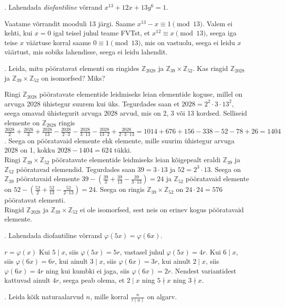 \documentclass[a4paper, 10pt]{article}
\newcommand{\Z}{\mathbb{Z}}
\begin{document}
. Lahendada \emph{diofantiline} võrrand $x^{13}+12x+13y^6=1$.

\bigskip
Vaatame võrrandit mooduli 13 järgi. Saame $x^{13}-x\equiv1 \pmod{13}$. Valem ei kehti, kui $x=0$ igal teisel juhul teame FVTst, et $x^{12}\equiv x \pmod{13}$, seega iga teise $x$ väärtuse korral saame $0\equiv 1 \pmod{13}$, mis on vastuolu, seega ei leidu $x$ väärtust, mis sobiks lahendisse, seega ei leidu lahendit.
\bigskip

. Leida, mitu pööratavat elementi on ringides $\Z_{2028}$ ja $\Z_{39}\times \Z_{52}$. Kas ringid $\Z_{2028}$ ja $\Z_{39}\times \Z_{52}$ on isomorfsed? Miks?

\bigskip
Ringi $\Z_{2028}$ pööratavate elementide leidmiseks leian elementide koguse, millel on arvuga 2028 ühistegur suurem kui üks. Tegurdades saan et $2028=2^2\cdot3\cdot13^2$, seega omavad ühistegurit arvuga 2028 arvud, mis on 2, 3 või 13 kordsed. Selliseid elemente on $\Z_{2028}$ ringis $\frac{2028}{2}+\frac{2028}{3}+\frac{2028}{13}-\frac{2028}{2\cdot3}-\frac{2028}{3\cdot13}-\frac{2028}{13\cdot2}+\frac{2028}{2\cdot3\cdot13}=1014+676+156-338-52-78+26=1404$. Seega on pööratavaid elemente ehk elemente, mille suurim ühistegur arvuga 2028 on 1, kokku $2028-1404=624$ tükki.\\
Ringi $\Z_{39}\times\Z_{52}$ pööratavate elementide leidmiseks leian kõigepealt eraldi $\Z_{39}$ ja $\Z_{52}$ pööratavad elemendid. Tegurdades saan $39=3\cdot13$ ja $52=2^3\cdot13$. Seega on $\Z_{39}$ pööratavaid elemente $39-\left(\frac{39}{3}+\frac{39}{13}-\frac{39}{3\cdot13}\right)=24$ ja $\Z_{52}$ pööratavaid elemente on $52-\left(\frac{52}{2}+\frac{52}{13}-\frac{52}{2\cdot13}\right)=24$. Seega on ringis $\Z_{39}\times\Z_{52}$ on $24\cdot24=576$ pööratavat elementi.\\
Ringid $\Z_{2028}$ ja $\Z_{39}\times\Z_{52}$ ei ole isomorfsed, sest neis on erinev kogus pööratavaid elemente.
\bigskip

. Lahendada diofantiline võrrand $\varphi(5x) = \varphi(6x)$.


\bigskip
$r=\varphi(x)$ Kui $5\mid x$, siis $ \varphi(5x)=5r$, vastasel juhul $\varphi(5x)=4r$. Kui $6\mid x$, siis $\varphi(6x)=6r$, kui ainult $3\mid x$, siis $\varphi(6x)=3r$, kui ainult $2\mid x$, siis $\varphi(6x)=4r$ ning kui kumbki ei jaga, siis $\varphi(6x)=2r$. Nendest variantidest kattuvad ainult $4r$, seega peab olema, et $2\mid x$ ning $5\nmid x$ ning $3\nmid x$.
\bigskip
\pagebreak

. Leida kõik naturaalarvud $n$, mille korral $\frac{n}{\tau(n)}$ on algarv. 
\end{document}
